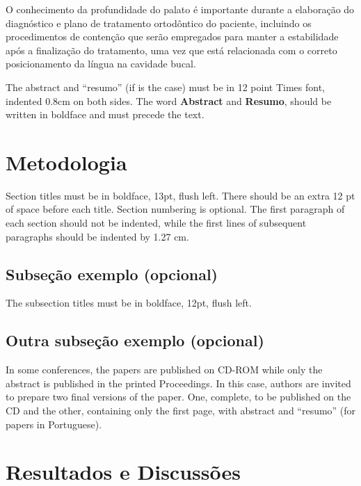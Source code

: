 \documentclass[12pt]{article}
\begin{document}
\vspace{.5cm}
\hfill
\begin{minipage}{.6\textwidth}
\footnotesize
O conhecimento da profundidade do palato é importante durante a elaboração do diagnóstico e plano de tratamento ortodôntico do paciente, incluindo os procedimentos de contenção que serão empregados para manter a estabilidade após a finalização do tratamento, uma vez que está relacionada com o correto posicionamento da língua na cavidade bucal.
\end{minipage}
\vspace{.5cm}

The abstract and ``resumo'' (if is the case) must be in 12 point Times font,
indented 0.8cm on both sides. The word \textbf{Abstract} and \textbf{Resumo},
should be written in boldface and must precede the text.

\section{Metodologia} \label{sec:metodologia}

Section titles must be in boldface, 13pt, flush left. There should be an extra
12 pt of space before each title. Section numbering is optional. The first
paragraph of each section should not be indented, while the first lines of
subsequent paragraphs should be indented by 1.27 cm.

\subsection{Subseção exemplo  (opcional)}

The subsection titles must be in boldface, 12pt, flush left.

\subsection{Outra subseção exemplo (opcional)}

In some conferences, the papers are published on CD-ROM while only the
abstract is published in the printed Proceedings. In this case, authors are
invited to prepare two final versions of the paper. One, complete, to be
published on the CD and the other, containing only the first page, with
abstract and ``resumo'' (for papers in Portuguese).

\section{Resultados e Discussões}
\end{document}
